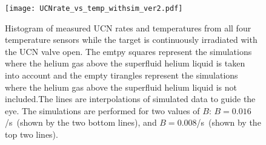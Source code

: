 


\begin{figure}[h!]
  \centering
  \texttt{[image: UCNrate\_vs\_temp\_withsim\_ver2.pdf]}
  \caption[UCN rate versus superfluid helium temperature data and
  simulations]{Histogram of measured UCN rates and temperatures from
    all four temperature sensors while the target is continuously
    irradiated with the UCN valve open. The emtpy squares represent
    the simulations where the helium gas above the superfluid helium
    liquid is taken into account and the empty tirangles represent the
    simulations where the helium gas above the superfluid helium
    liquid is not included.The lines are interpolations of simulated
    data to guide the eye. The simulations are performed for two
    values of $B$: $B = 0.016$/s~(shown by the two bottom lines), and
    $B = 0.008$/s~(shown by the top two lines). }
  \label{fig:rate_vs_temp_sim}
\end{figure}


